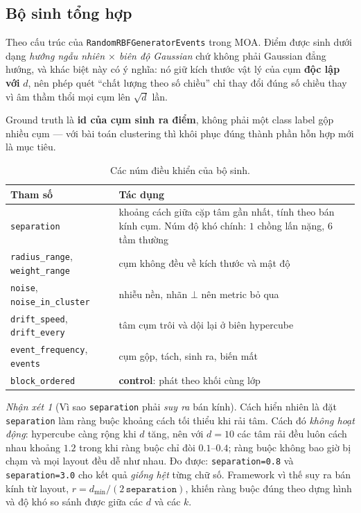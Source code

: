 \documentclass[11pt,a4paper]{article}
\theoremstyle{remark}
\newtheorem{remark}{Nhận xét}
\begin{document}
\subsection{Bộ sinh tổng hợp}

Theo cấu trúc của \texttt{RandomRBFGeneratorEvents} trong MOA. Điểm được sinh
dưới dạng \emph{hướng ngẫu nhiên $\times$ biên độ Gaussian} chứ không phải
Gaussian đẳng hướng, và khác biệt này có ý nghĩa: nó giữ kích thước vật lý của
cụm \textbf{độc lập với} $d$, nên phép quét ``chất lượng theo số chiều'' chỉ thay
đổi đúng số chiều thay vì âm thầm thổi mọi cụm lên $\sqrt{d}$ lần.

Ground truth là \textbf{id của cụm sinh ra điểm}, không phải một class label gộp
nhiều cụm --- với bài toán clustering thì khôi phục đúng thành phần hỗn hợp mới
là mục tiêu.

\begin{table}[htbp]
\centering
\small
\caption{Các núm điều khiển của bộ sinh.}
\label{tab:generator}
\begin{tabular}{@{}lp{8.6cm}@{}}
\toprule
\textbf{Tham số} & \textbf{Tác dụng} \\
\midrule
\texttt{separation} & khoảng cách giữa cặp tâm gần nhất, tính theo bán kính cụm.
Núm độ khó chính: $1$ chồng lấn nặng, $6$ tầm thường \\
\texttt{radius\_range}, \texttt{weight\_range} & cụm không đều về kích thước và mật độ \\
\texttt{noise}, \texttt{noise\_in\_cluster} & nhiễu nền, nhãn $\bot$ nên metric bỏ qua \\
\texttt{drift\_speed}, \texttt{drift\_every} & tâm cụm trôi và dội lại ở biên hypercube \\
\texttt{event\_frequency}, \texttt{events} & cụm gộp, tách, sinh ra, biến mất \\
\texttt{block\_ordered} & \textbf{control}: phát theo khối cùng lớp \\
\bottomrule
\end{tabular}
\end{table}

\begin{remark}[Vì sao \texttt{separation} phải \emph{suy ra} bán kính]
\label{rem:separation}
Cách hiển nhiên là đặt \texttt{separation} làm ràng buộc khoảng cách tối thiểu
khi rải tâm. Cách đó \emph{không hoạt động}: hypercube càng rộng khi $d$ tăng,
nên với $d = 10$ các tâm rải đều luôn cách nhau khoảng $1.2$ trong khi ràng buộc
chỉ đòi $0.1$--$0.4$; ràng buộc không bao giờ bị chạm và mọi layout đều dễ như
nhau. Đo được: \texttt{separation=0.8} và \texttt{separation=3.0} cho kết quả
\emph{giống hệt} từng chữ số. Framework vì thế suy ra bán kính từ layout,
$r = d_{\min} / (2\,\texttt{separation})$, khiến ràng buộc đúng theo dựng hình và
độ khó so sánh được giữa các $d$ và các $k$.
\end{remark}
\end{document}
